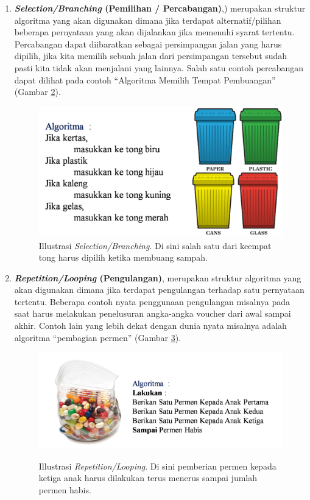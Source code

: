 \begin{enumerate}
\begin{figure}
		\caption{Illustrasi \textit{sequence}. Ada 3 \textit{statement} di dalam  1 \textit{sequence}untuk memindahkan isi dari kedua gelas.}
		\label{fig:illustrasiSequence}
	\end{figure}
	\FloatBarrier
	\item \textbf{\textit{Selection/Branching} (Pemilihan / Percabangan)},) merupakan struktur algoritma yang akan digunakan dimana jika terdapat alternatif/pilihan beberapa pernyataan yang akan dijalankan jika memenuhi syarat tertentu. Percabangan dapat diibaratkan sebagai persimpangan jalan yang harus dipilih, jika kita memilih sebuah jalan dari persimpangan tersebut sudah pasti kita tidak akan menjalani yang lainnya. Salah satu contoh percabangan dapat dilihat pada contoh ``Algoritma Memilih Tempat Pembuangan'' (Gambar \ref{fig:illustrasiBranching}).
		\begin{figure}
			\centering
			\includegraphics[scale=0.4]{fig/1/Gambar14.png}	
			\caption{Illustrasi \textit{Selection/Branching}. Di sini salah satu dari keempat tong harus dipilih ketika membuang sampah.}
		\label{fig:illustrasiBranching}
		\end{figure}
	\FloatBarrier
	\item \textbf{\textit{Repetition/Looping} (Pengulangan)}, merupakan struktur algoritma yang akan digunakan dimana jika terdapat pengulangan terhadap satu pernyataan tertentu. Beberapa contoh nyata penggunaan pengulangan misalnya pada saat harus melakukan penelusuran angka-angka voucher dari awal sampai akhir. Contoh lain yang lebih dekat dengan dunia nyata misalnya adalah algoritma ``pembagian permen'' (Gambar \ref{fig:illustrasiLoop}).
		\begin{figure}
		\centering
		\includegraphics[scale=0.4]{fig/1/Gambar15.png}	
		\label{fig:illustrasiLoop}
		\caption{Illustrasi \textit{Repetition/Looping}. Di sini pemberian permen kepada ketiga anak harus dilakukan terus menerus sampai jumlah permen habis.}
		\end{figure}
\end{enumerate}

